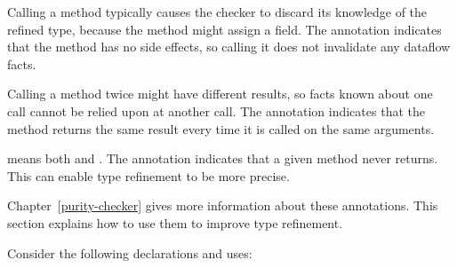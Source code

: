 Calling a method typically causes the checker to discard its knowledge of
the refined type, because the method might assign a field.
The  annotation indicates that
the method has no side effects, so calling it does not invalidate any
dataflow facts.

Calling a method twice might have different results, so facts known about
one call cannot be relied upon at another call.
The  annotation indicates that
the method returns the same result every time it is called on the same
arguments.

 means both
 and
.
The  annotation
indicates that a given method never returns.  This can enable
type refinement to be more precise.

Chapter~\ref{purity-checker} gives more information about these annotations.
This section explains how to use them to improve type refinement.



Consider the following declarations and uses:

